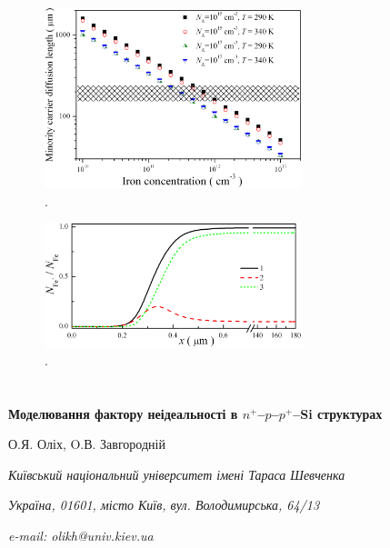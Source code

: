 ﻿\documentclass[12pt]{article}
\begin{document}
\begin{figure}
\includegraphics[width=7.5cm]{FigLn}
\caption{.
}
\label{FigLn}
\end{figure}

\begin{figure}
\includegraphics[width=7.5cm]{FigDelFei}
\caption{.
}
\label{FigDelFei}
\end{figure}

\clearpage

\section*{}

\begin{center}
{\bfseries Моделювання фактору неідеальності в $n^+$--$p$--$p^+$--Si структурах}

О.Я. Оліх, O.В. Завгородній

\emph{Київський національний університет імені Тараса Шевченка}

\emph{Україна, 01601, місто Київ, вул. Володимирська, 64/13}

\emph{e-mail: olikh@univ.kiev.ua}

\end{center}
\end{document}
